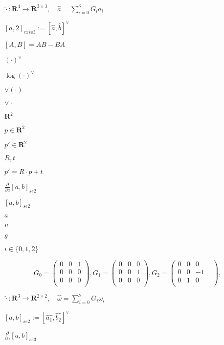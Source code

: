 \documentclass{article}
\begin{document}
$ \widehat{\cdot}: \mathbf{R}^4 \rightarrow \mathbf{R}^{3\times 3}, \quad \widehat{a} = \sum_{i=0}^3 G_i a_i $
\pagebreak

$ [a, 2]_{rxso3} := [\widehat{a}, \widehat{b}]^\vee $
\pagebreak

$ [A,B] = AB-BA $
\pagebreak

$ (\cdot)^\vee $
\pagebreak

$ \log({\cdot})^\vee $
\pagebreak

$ \vee(\cdot) $
\pagebreak

$ \vee{\cdot} $
\pagebreak

$ \mathbf{R}^2 $
\pagebreak

$p \in \mathbf{R}^2 $
\pagebreak

$p' \in \mathbf{R}^2 $
\pagebreak

$R,t$
\pagebreak

$ p' = R\cdot p + t $
\pagebreak

$ \frac{\partial}{\partial a} [a, b]_{se2} $
\pagebreak

$ [a, b]_{se2} $
\pagebreak

$ a $
\pagebreak

$ \upsilon $
\pagebreak

$ \theta $
\pagebreak

$ i \in \{0,1,2\} $
\pagebreak

\[ G_0 = \left( \begin{array}{ccc} 0& 0& 1\\ 0& 0& 0\\ 0& 0& 0\\ \end{array} \right), G_1 = \left( \begin{array}{cccc} 0& 0& 0\\ 0& 0& 1\\ 0& 0& 0\\ \end{array} \right), G_2 = \left( \begin{array}{cccc} 0& 0& 0&\\ 0& 0& -1&\\ 0& 1& 0&\\ \end{array} \right), \]
\pagebreak

$ \widehat{\cdot}: \mathbf{R}^3 \rightarrow \mathbf{R}^{2\times 2}, \quad \widehat{\omega} = \sum_{i=0}^2 G_i \omega_i $
\pagebreak

$ [a, b]_{se2} := [\widehat{a_1}, \widehat{b_2}]^\vee $
\pagebreak

$ \frac{\partial}{\partial a} [a, b]_{se3} $
\pagebreak
\end{document}
